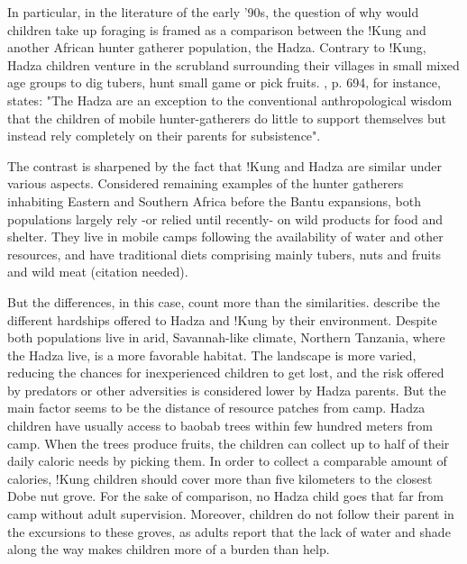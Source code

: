 In particular, in the literature of the early '90s, the question of why would children take up foraging is framed as a comparison between the !Kung and another African hunter gatherer population, the Hadza. Contrary to !Kung, Hadza children venture in the scrubland surrounding their villages in small mixed age groups to dig tubers, hunt small game or pick fruits.  \cite{hawkes_hadza_1995}, p. 694, for instance, states: "The Hadza are an exception to the conventional anthropological wisdom that the children of mobile hunter-gatherers do little to support themselves but instead rely completely on their parents for subsistence". 

The contrast is sharpened by the fact that !Kung and Hadza are similar under various aspects. Considered remaining examples of the hunter gatherers inhabiting Eastern and Southern Africa before the Bantu expansions, both populations largely rely -or relied until recently- on wild products for food and shelter. They live in mobile camps following the availability of water and other resources, and have traditional diets comprising mainly tubers, nuts and fruits and wild meat (citation needed).

But the differences, in this case, count more than the similarities.
\cite{blurton_jones_foraging_1994, blurton_jones_differences_1994} describe the different hardships offered to Hadza and !Kung by their environment. Despite both populations live in arid, Savannah-like climate, Northern Tanzania, where the Hadza live, is a more favorable habitat. The landscape is more varied, reducing the chances for inexperienced children to get lost, and the risk offered by predators or other adversities is considered lower by Hadza parents. But the main factor seems to be the distance of resource patches from camp. Hadza children have usually access to baobab trees within few hundred meters from camp. When the trees produce fruits, the children can collect up to half of their daily caloric needs by picking them. In order to collect a comparable amount of calories, !Kung children should cover more than five kilometers to the closest Dobe nut grove. For the sake of comparison, no Hadza child goes that far from camp without adult supervision. Moreover, children do not follow their parent in the excursions to these groves, as adults report that the lack of water and shade along the way makes children more of a burden than help. 

